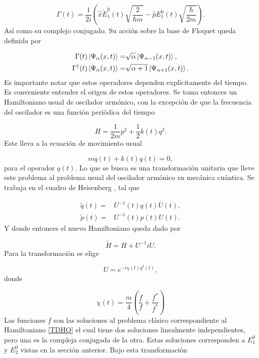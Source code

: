 \documentclass[10pt,a4paper]{report}
\begin{document}
\begin{equation}\label{FloquetOperators}
\Gamma(t) = \frac{1}{2i}(\hat{x}\dot{E}_1^0(t)\sqrt{\frac{2}{\hbar m}}-\hat{p}E_1^0(t)\sqrt{\frac{\hbar}{2m}}).
\end{equation} Así como su complejo conjugado. Su acción sobre la base de Floquet queda definida por

\begin{align*}
\Gamma(t) \Ket{\Psi_\alpha (x,t)} =& \sqrt{\alpha}\Ket{\Psi_{\alpha-1} (x,t)}, \\
\Gamma^\dagger(t) \Ket{\Psi_\alpha (x,t)} =& \sqrt{\alpha+1}\Ket{\Psi_{\alpha+1} (x,t)}.
\end{align*}Es importante notar que estos operadores dependen explícitamente del tiempo. Es conveniente entender el origen de estos operadores. Se toma entonces un Hamiltoniano usual de oscilador armónico, con la excepción de que la frecuencia del oscilador es una función periódica del tiempo

\begin{equation}\label{TDHO}
H = \frac{1}{2m}p^2 + \frac{1}{2}k(t)q^2.
\end{equation} Este lleva a la ecuación de movimiento usual

\begin{equation}
m\ddot{q}(t) + k(t)q(t) = 0,
\end{equation} para el operador $q(t)$. Lo que se busca es una transformación unitaria que lleve este problema al problema usual del oscilador armónico en mecánica cuántica. Se trabaja en el cuadro de Heisenberg \cite{SakuraiQM}, tal que

\begin{align}
\tilde{q}(t) =& U^{-1}(t)q(t)U(t),\\
\tilde{p}(t) =& U^{-1}(t)p(t)U(t).
\end{align} Y donde entonces el nuevo Hamiltoniano queda dado por

\begin{equation}
\tilde{H} = H + U^{-1}i\dot{U}.
\end{equation} Para la transformación se elige

\begin{equation}
U = e^{-i\chi(t)q^2(t)},
\end{equation} donde

\begin{equation}
\chi(t) = \frac{m}{4}(\frac{\dot{f}}{f}+\frac{\dot{f^*}}{f^*})
\end{equation} Las funciones $f$ son las soluciones al problema clásico correspondiente al Hamiltoniano \eqref{TDHO} el cual tiene dos soluciones linealmente independientes, pero una es la compleja conjugada de la otra. Estas soluciones corresponden a $E_1^0$  y $E_2^0$ vistas en la sección anterior. Bajo esta transformación
\end{document}
